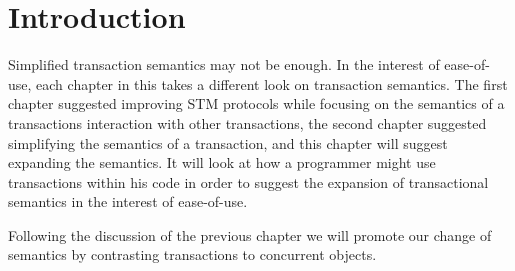 % 
% 
% 
% 
% 
% 
% 
% 
% 

\section{Introduction}
\label{sec:SIintro}

Simplified transaction semantics may not be enough.
In the interest of ease-of-use, each chapter in this takes a 
different look on transaction semantics.
The first chapter suggested improving STM
protocols while focusing on the semantics of a transactions
interaction with other transactions, the second
chapter suggested simplifying the semantics of a transaction,
and this chapter will suggest expanding the semantics.
It will look at how a programmer might use transactions
within his code in order to suggest the expansion of transactional
semantics in the interest of ease-of-use.

Following the discussion of the previous chapter we will promote our change
of semantics by contrasting transactions to concurrent objects.

